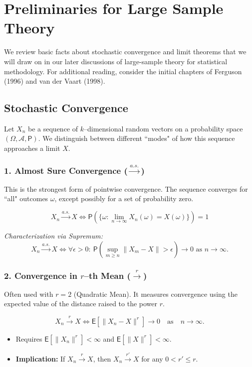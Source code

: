\chapter{Preliminaries for Large Sample Theory}
\label{cha:preliminaries_large_sample}
We review basic facts about stochastic convergence and limit theorems
that we will draw on in our later discussions of large-sample theory for
statistical methodology. For additional reading, consider the initial
chapters of Ferguson (1996) and van der Vaart (1998).

\section{Stochastic Convergence}

Let $X_n$ be a sequence of $k$--dimensional random vectors on a probability space $(\Omega, \mathcal{A}, \mathsf{P})$. We distinguish between different ``modes" of how this sequence approaches a limit $X$.

\subsection*{1. Almost Sure Convergence ($\xrightarrow{a.s.}$)}
This is the strongest form of pointwise convergence. The sequence converges for ``all" outcomes $\omega$, except possibly for a set of probability zero.

\[ X_n \xrightarrow{a.s.} X \iff \mathsf{P}\left( \{ \omega : \lim_{n \to \infty} X_n(\omega) = X(\omega) \} \right) = 1 \]

\textit{Characterization via Supremum:}
\[ X_n \xrightarrow{a.s.} X \iff \forall \epsilon > 0 : \ \mathsf{P}\left(\sup_{m \geq n} \|X_m - X\| > \epsilon\right) \to 0 \text{ as } n \to \infty. \]

\subsection*{2. Convergence in $r$--th Mean ($\xrightarrow{r}$)}
Often used with $r=2$ (Quadratic Mean). It measures convergence using the expected value of the distance raised to the power $r$.

\[ X_n \xrightarrow{r} X \iff \mathsf{E}[\|X_n - X\|^r] \to 0 \quad \text{as} \quad n \to \infty. \]
\begin{itemize}
    \item Requires $\mathsf{E}[\|X_n\|^r] < \infty$ and $\mathsf{E}[\|X\|^r] < \infty$.
    \item \textbf{Implication:} If $X_n \xrightarrow{r} X$, then $X_n \xrightarrow{r'} X$ for any $0 < r' \le r$.
\end{itemize}

